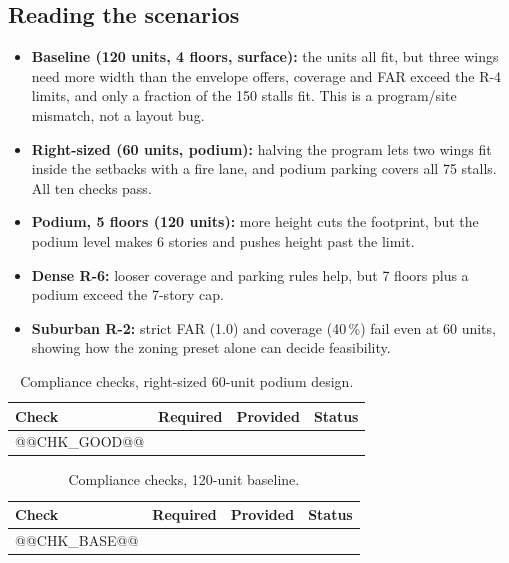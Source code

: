 \documentclass[11pt]{article}
\begin{document}
\subsection{Reading the scenarios}
\begin{itemize}
\item \textbf{Baseline (120 units, 4 floors, surface):} the units all fit, but three wings need more width than the envelope offers, coverage and FAR exceed the R-4 limits, and only a fraction of the 150 stalls fit. This is a program/site mismatch, not a layout bug.
\item \textbf{Right-sized (60 units, podium):} halving the program lets two wings fit inside the setbacks with a fire lane, and podium parking covers all 75 stalls. All ten checks pass.
\item \textbf{Podium, 5 floors (120 units):} more height cuts the footprint, but the podium level makes 6 stories and pushes height past the limit.
\item \textbf{Dense R-6:} looser coverage and parking rules help, but 7 floors plus a podium exceed the 7-story cap.
\item \textbf{Suburban R-2:} strict FAR (1.0) and coverage (40\,\%) fail even at 60 units, showing how the zoning preset alone can decide feasibility.
\end{itemize}

\begin{table}[H]\centering\footnotesize
\caption{Compliance checks, right-sized 60-unit podium design.}
\begin{tabular}{llll}\toprule Check & Required & Provided & Status \\ \midrule
@@CHK_GOOD@@\bottomrule\end{tabular}\end{table}
\begin{table}[H]\centering\footnotesize
\caption{Compliance checks, 120-unit baseline.}
\begin{tabular}{llll}\toprule Check & Required & Provided & Status \\ \midrule
@@CHK_BASE@@\bottomrule\end{tabular}\end{table}
\end{document}
